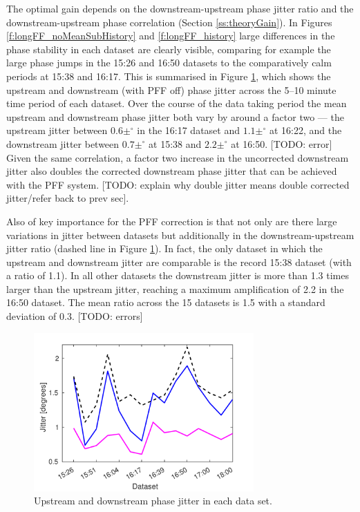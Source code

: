 The optimal gain depends on the downstream-upstream phase jitter ratio and the 
downstream-upstream phase correlation (Section \ref{ss:theoryGain}). In Figures 
\ref{f:longFF_noMeanSubHistory} and \ref{f:longFF_history} large differences in the 
phase stability in each dataset are clearly visible, comparing for example the large 
phase jumps in the 15:26 and 16:50 datasets to the comparatively calm periods at 15:38 
and 16:17. This is summarised in Figure \ref{f:longFF_jitFFOff}, which shows the 
upstream and downstream (with PFF off) phase jitter across the 5--10 minute time period 
of each dataset. Over the course of the data taking period the mean upstream and 
downstream phase jitter both vary by around a factor two --- the upstream jitter between \(0.6\pm^\circ\) in the 16:17 dataset and \(1.1\pm^\circ\) at 16:22, and the downstream 
jitter between \(0.7\pm^\circ\) at 15:38 and \(2.2\pm^\circ\) at 16:50. [TODO: error] 
Given the same correlation, a factor two increase in the uncorrected downstream jitter 
also doubles the corrected downstream phase jitter that can be achieved with the PFF 
system. [TODO: explain why double jitter means double corrected jitter/refer back to 
prev sec].


Also of key importance for the PFF correction is that not only are there large 
variations in jitter between datasets but additionally in the downstream-upstream jitter ratio (dashed line in Figure \ref{f:longFF_jitFFOff}). In fact, the only dataset in 
which the upstream and downstream jitter are comparable is the record 15:38 dataset 
(with a ratio of 1.1). In all other datasets the downstream jitter is more than 1.3 
times larger than the upstream jitter, reaching a maximum amplification of 2.2 in the 
16:50 dataset. The mean ratio across the 15 datasets is 1.5 with a standard deviation of 0.3. [TODO: errors]


\begin{figure}
  \centering
  \includegraphics[width=0.75\textwidth]{Figures/feedforward/longFF_jitDatSetFFOff}
  \caption{Upstream and downstream phase jitter in each data set.}
  \label{f:longFF_jitFFOff}
\end{figure}

